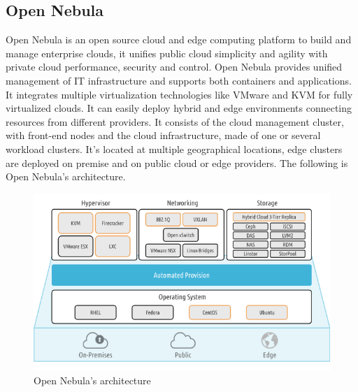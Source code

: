 \subsection{Open Nebula}
Open Nebula is an open source cloud and edge computing platform to build and manage enterprise clouds, it unifies public cloud simplicity and agility with private cloud performance, security and control. \n
Open Nebula provides unified management of IT infrastructure and supports both containers and applications. It integrates multiple virtualization technologies like VMware and KVM for fully virtualized clouds. It can easily deploy hybrid and edge environments connecting resources from different providers. \n
It consists of the cloud management cluster, with front-end nodes and the cloud infrastructure, made of one or several workload clusters. It's located at multiple geographical locations, edge clusters are deployed on premise and on public cloud or edge providers. The following is Open Nebula's architecture.
\begin{figure}
    \centering
    \includegraphics[scale=0.6]{Images/Open_Nebula.png}
    \caption{Open Nebula's architecture}
\end{figure}
